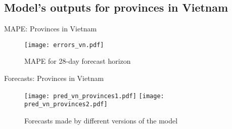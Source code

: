 \subsection{Model's outputs for provinces in Vietnam}

\begin{frame}{MAPE: Provinces in Vietnam}
    \begin{figure}[h]
        \centering
        \texttt{[image: errors\_vn.pdf]}
        \caption{MAPE for 28-day forecast horizon}
    \end{figure}
\end{frame}

\begin{frame}{Forecasts: Provinces in Vietnam}
    \begin{figure}[!htb]
        \centering
        \texttt{[image: pred\_vn\_provinces1.pdf]}
        \texttt{[image: pred\_vn\_provinces2.pdf]}
        \caption{Forecasts made by different versions of the model}
    \end{figure}
\end{frame}

